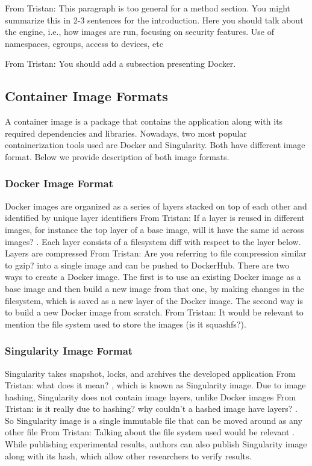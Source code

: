 \documentclass[a4paper,num-refs]{oup-contemporary}
\newcommand{\TG}[1]{\color{blue}From Tristan: #1 \color{black}}
\begin{document}
\TG{This paragraph is too general for a method section. You might summarize this in
2-3 sentences for the introduction. Here you should talk about the engine,
i.e., how images are run, focusing on security features. Use of namespaces,
cgroups, access to devices, etc}

\TG{You should add a subsection presenting Docker.}

\subsection{Container Image Formats}

A container image is a package that contains the application along with its
required dependencies and libraries.
Nowadays, two most popular containerization tools used are Docker and Singularity.
Both have different image format. Below we provide description of both image
formats.

\subsubsection{Docker Image Format}

Docker images are organized as a series of layers stacked on top of each
other and identified by unique layer identifiers \TG{If a layer is reused
in different images, for instance the top layer of a base image, will it
have the same id across images?}. Each layer consists of a filesystem diff
with respect to the layer below. Layers are compressed \TG{Are you
referring to file compression similar to gzip?} into a single image and can
be pushed to DockerHub. There are two ways to create a Docker image. The
first is to use an existing Docker image as a base image and then build a
new image from that one, by making changes in the filesystem, which is
saved as a new layer of the Docker image. The second way is to build a new
Docker image from scratch. \TG{It would be relevant to mention the file
system used to store the images (is it squashfs?).}

\subsubsection{Singularity Image Format}

Singularity takes snapshot, locks, and archives the developed application
\TG{what does it mean?}, which is known as Singularity image. Due to image
hashing, Singularity does not contain image layers, unlike Docker images
\TG{is it really due to hashing? why couldn't a hashed image have layers?}.
So Singularity image is a single immutable file that can be moved around as
any other file \TG{Talking about the file system used would be relevant}.
While publishing experimental results, authors can also publish Singularity
image along with its hash, which allow other researchers to verify results.
\end{document}
